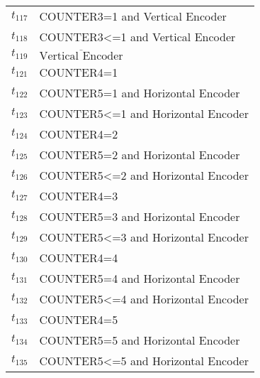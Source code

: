\begin{longtable}{M{5cm}M{10cm}}
\hyperlink{completeNet:t117}{\hypertarget{completeTable:t117}{$t_{117}$}} & COUNTER3=1 and Vertical Encoder\\
\hyperlink{completeNet:t118}{\hypertarget{completeTable:t118}{$t_{118}$}} & COUNTER3<=1 and Vertical Encoder\\
\hyperlink{completeNet:t119}{\hypertarget{completeTable:t119}{$t_{119}$}} & \(\overline{\mbox{Vertical Encoder}}\)\\
\hyperlink{completeNet:t121}{\hypertarget{completeTable:t121}{$t_{121}$}} & COUNTER4=1\\
\hyperlink{completeNet:t122}{\hypertarget{completeTable:t122}{$t_{122}$}} & COUNTER5=1 and Horizontal Encoder\\
\hyperlink{completeNet:t123}{\hypertarget{completeTable:t123}{$t_{123}$}} & COUNTER5<=1 and Horizontal Encoder\\
\hyperlink{completeNet:t124}{\hypertarget{completeTable:t124}{$t_{124}$}} & COUNTER4=2\\
\hyperlink{completeNet:t125}{\hypertarget{completeTable:t125}{$t_{125}$}} & COUNTER5=2 and Horizontal Encoder\\
\hyperlink{completeNet:t126}{\hypertarget{completeTable:t126}{$t_{126}$}} & COUNTER5<=2 and Horizontal Encoder\\
\hyperlink{completeNet:t127}{\hypertarget{completeTable:t127}{$t_{127}$}} & COUNTER4=3\\
\hyperlink{completeNet:t128}{\hypertarget{completeTable:t128}{$t_{128}$}} & COUNTER5=3 and Horizontal Encoder\\
\hyperlink{completeNet:t129}{\hypertarget{completeTable:t129}{$t_{129}$}} & COUNTER5<=3 and Horizontal Encoder\\
\hyperlink{completeNet:t130}{\hypertarget{completeTable:t130}{$t_{130}$}} & COUNTER4=4\\
\hyperlink{completeNet:t131}{\hypertarget{completeTable:t131}{$t_{131}$}} & COUNTER5=4 and Horizontal Encoder\\
\hyperlink{completeNet:t132}{\hypertarget{completeTable:t132}{$t_{132}$}} & COUNTER5<=4 and Horizontal Encoder\\
\hyperlink{completeNet:t133}{\hypertarget{completeTable:t133}{$t_{133}$}} & COUNTER4=5\\
\hyperlink{completeNet:t134}{\hypertarget{completeTable:t134}{$t_{134}$}} & COUNTER5=5 and Horizontal Encoder\\
\hyperlink{completeNet:t135}{\hypertarget{completeTable:t135}{$t_{135}$}} & COUNTER5<=5 and Horizontal Encoder\\

\end{longtable}
